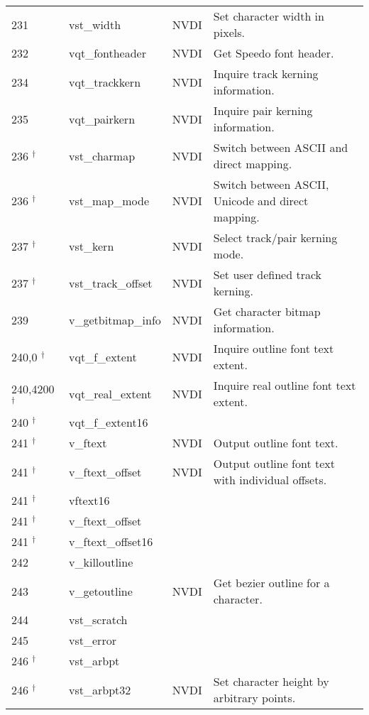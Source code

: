 \documentclass[a4paper]{article}
\begin{document}
\begin{supertabular}{|p{1.8cm}|p{3.0cm}|p{1.5cm}|p{8.7cm}|}
231             & vst\_width          & NVDI  & Set character width in pixels. \\
232             & vqt\_fontheader     & NVDI  & Get Speedo font header. \\
234             & vqt\_trackkern      & NVDI  & Inquire track kerning information. \\
235             & vqt\_pairkern       & NVDI  & Inquire pair kerning information. \\
236 $^\dag$     & vst\_charmap        & NVDI  & Switch between ASCII and direct mapping. \\
236 $^\dag$     & vst\_map\_mode      & NVDI  & Switch between ASCII, Unicode and direct mapping. \\
237 $^\dag$     & vst\_kern           & NVDI  & Select track/pair kerning mode. \\
237 $^\dag$     & vst\_track\_offset  & NVDI  & Set user defined track kerning. \\
239             & v\_getbitmap\_info  & NVDI  & Get character bitmap information. \\
240,0 $^\dag$   & vqt\_f\_extent      & NVDI  & Inquire outline font text extent. \\
240,4200 $^\dag$& vqt\_real\_extent   & NVDI  & Inquire real outline font text extent. \\
240 $^\dag$     & vqt\_f\_extent16    &       &  \\
241 $^\dag$     & v\_ftext            & NVDI  & Output outline font text. \\
241 $^\dag$     & v\_ftext\_offset    & NVDI  & Output outline font text with individual offsets. \\
241 $^\dag$     & vftext16            &       &  \\
241 $^\dag$     & v\_ftext\_offset    &       &  \\
241 $^\dag$     & v\_ftext\_offset16  &       &  \\
242             & v\_killoutline      &       &  \\
243             & v\_getoutline       & NVDI  & Get bezier outline for a character. \\
244             & vst\_scratch        &       &  \\
245             & vst\_error          &       &  \\
246 $^\dag$     & vst\_arbpt          &       &  \\
246 $^\dag$     & vst\_arbpt32        & NVDI  & Set character height by arbitrary points. \\

\end{supertabular}
\end{document}
